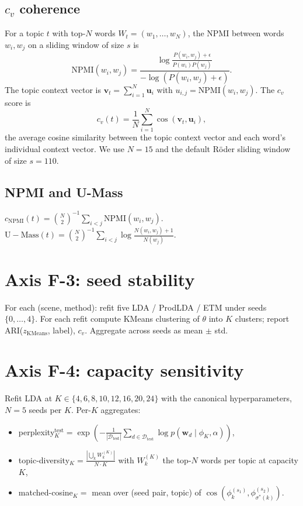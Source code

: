 \documentclass[11pt,a4paper]{article}
\begin{document}
\subsection{$c_v$ coherence}
For a topic $t$ with top-$N$ words $W_t = (w_1, \ldots, w_N)$, the
NPMI between words $w_i, w_j$ on a sliding window of size $s$ is
\begin{equation}
\mathrm{NPMI}(w_i, w_j) = \frac{\log
   \frac{P(w_i, w_j) + \epsilon}{P(w_i) P(w_j)}
}{- \log (P(w_i, w_j) + \epsilon)}.
\end{equation}
The topic context vector is
$\mathbf{v}_t = \sum_{i=1}^{N} \mathbf{u}_i$ with
$u_{i,j} = \mathrm{NPMI}(w_i, w_j)$. The $c_v$ score is
\begin{equation}
c_v(t) = \frac{1}{N} \sum_{i=1}^{N}
\cos(\mathbf{v}_t, \mathbf{u}_i),
\end{equation}
the average cosine similarity between the topic context vector and
each word's individual context vector. We use $N = 15$ and the
default Röder sliding window of size $s = 110$.

\subsection{NPMI and U-Mass}
$c_{\text{NPMI}}(t) = \binom{N}{2}^{-1} \sum_{i<j} \mathrm{NPMI}(w_i,
w_j)$.
$\mathrm{U\!-\!Mass}(t) = \binom{N}{2}^{-1} \sum_{i<j} \log
\frac{N(w_i, w_j) + 1}{N(w_j)}$.

\section{Axis F-3: seed stability}
For each (scene, method): refit five LDA / ProdLDA / ETM under seeds
$\{0, \ldots, 4\}$. For each refit compute KMeans clustering of
$\theta$ into $K$ clusters; report ARI($z_{\text{KMeans}}$, label),
$c_v$. Aggregate across seeds as mean $\pm$ std.

\section{Axis F-4: capacity sensitivity}
Refit LDA at $K \in \{4, 6, 8, 10, 12, 16, 20, 24\}$ with the
canonical hyperparameters, $N = 5$ seeds per $K$. Per-$K$ aggregates:
\begin{itemize}
\item perplexity$_K^{\text{test}} = \exp(-\frac{1}{|\mathcal{D}_{\text{test}}|}
\sum_{d \in \mathcal{D}_{\text{test}}} \log p(\mathbf{w}_d \mid \phi_K, \alpha))$,
\item topic-diversity$_K = \frac{|\bigcup_k W_k^{(K)}|}{N \cdot K}$
with $W_k^{(K)}$ the top-$N$ words per topic at capacity $K$,
\item matched-cosine$_K = $ mean over (seed pair, topic) of
$\cos(\phi^{(s_1)}_k, \phi^{(s_2)}_{\sigma^*(k)})$.
\end{itemize}
\end{document}
